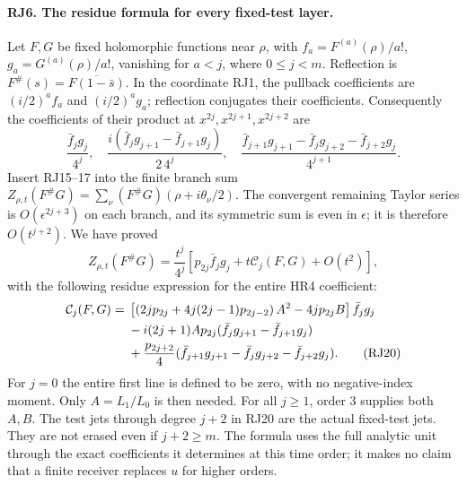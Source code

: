 \documentclass[11pt,a4paper]{article}
\theoremstyle{definition}\newtheorem{definition}[theorem]{Definition}
\begin{document}
\paragraph{RJ6. The residue formula for every fixed-test layer.}
Let $F,G$ be fixed holomorphic functions near $\rho$, with
$f_a=F^{(a)}(\rho)/a!$, $g_a=G^{(a)}(\rho)/a!$, vanishing for
$a<j$, where $0\le j<m$. Reflection is
$F^\#(s)=\overline{F(1-\bar s)}$. In the coordinate RJ1, the
pullback coefficients are $(i/2)^a f_a$ and $(i/2)^a g_a$;
reflection conjugates their coefficients. Consequently the
coefficients of their product at $x^{2j},x^{2j+1},x^{2j+2}$ are
\[
 \frac{\bar f_jg_j}{4^j},\quad
 \frac{i(\bar f_jg_{j+1}-\bar f_{j+1}g_j)}{2\,4^j},\quad
 \frac{\bar f_{j+1}g_{j+1}-\bar f_jg_{j+2}-\bar f_{j+2}g_j}{4^{j+1}}.
 \tag{RJ18}
\]
Insert RJ15--17 into the finite branch sum
$Z_{\rho,t}(F^\#G)=\sum_\nu(F^\#G)(\rho+i\theta_\nu/2)$.
The convergent remaining Taylor series is $O(\epsilon^{2j+3})$
on each branch, and its symmetric sum is even in $\epsilon$;
it is therefore $O(t^{j+2})$. We have proved
\[
 Z_{\rho,t}(F^\#G)=\frac{t^j}{4^j}
       \left[p_{2j}\bar f_jg_j+t\mathcal C_j(F,G)+O(t^2)\right],
 \tag{RJ19}
\]
with the following residue expression for the entire HR4 coefficient:
\begin{align}
 \mathcal C_j(F,G)={}&
 \left[\left(2j p_{2j}+4j(2j-1)p_{2j-2}\right)A^2
                         -4j p_{2j}B\right]\bar f_jg_j\notag\\
 &-i(2j+1)A p_{2j}
            (\bar f_jg_{j+1}-\bar f_{j+1}g_j)\notag\\
 &+\frac{p_{2j+2}}4
       (\bar f_{j+1}g_{j+1}-\bar f_jg_{j+2}-\bar f_{j+2}g_j).
 \tag{RJ20}
\end{align}
For $j=0$ the entire first line is defined to be zero, with no
negative-index moment. Only $A=L_1/L_0$ is then needed.
For all $j\ge1$, order $3$ supplies both $A,B$. The test jets
through degree $j+2$ in RJ20 are the actual fixed-test jets. They
are not erased even if $j+2\ge m$. The formula uses the full
analytic unit through the exact coefficients it determines at this
time order; it makes no claim that a finite receiver replaces $u$
for higher orders.
\end{document}
